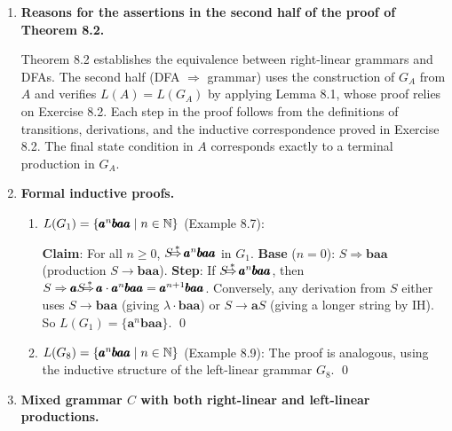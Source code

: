 \begin{enumerate}[{8.}1. ]
\begin{enumerate}
\item Inductive statement: For all $n \geq 0$ and $x \in \Sigma^n$ and nonterminal $A$: $A \DRightarrow x$ in the left-linear grammar $G$ iff the reversed string $x^r$ leads from the start state to $A$ in the reversed automaton.

\item Proof by induction on $|x|$, symmetric to Exercise 8.23. \qed
\end{enumerate}

\item \textbf{Reasons for the assertions in the second half of the proof of Theorem 8.2.}

Theorem 8.2 establishes the equivalence between right-linear grammars and DFAs. The second half (DFA $\Rightarrow$ grammar) uses the construction of $G_A$ from $A$ and verifies $L(A) = L(G_A)$ by applying Lemma 8.1, whose proof relies on Exercise 8.2. Each step in the proof follows from the definitions of transitions, derivations, and the inductive correspondence proved in Exercise 8.2. The final state condition in $A$ corresponds exactly to a terminal production in $G_A$.

\item \textbf{Formal inductive proofs.}

\begin{enumerate}
\item $L(G_1) = \{\pmb{a}^n\pmb{baa} \mid n \in \mathbb{N}\}$ (Example 8.7):

\textbf{Claim}: For all $n \geq 0$, $S \DRightarrow \pmb{a}^n\pmb{baa}$ in $G_1$.
\textbf{Base} ($n=0$): $S \Rightarrow \pmb{baa}$ (production $S \to \pmb{baa}$).
\textbf{Step}: If $S \DRightarrow \pmb{a}^n\pmb{baa}$, then $S \Rightarrow \pmb{a}S \DRightarrow \pmb{a}\cdot\pmb{a}^n\pmb{baa} = \pmb{a}^{n+1}\pmb{baa}$.
Conversely, any derivation from $S$ either uses $S \to \pmb{baa}$ (giving $\lambda\cdot\pmb{baa}$) or $S \to \pmb{a}S$ (giving a longer string by IH). So $L(G_1) = \{\pmb{a}^n\pmb{baa}\}$. \qed

\item $L(G_8) = \{\pmb{a}^n\pmb{baa} \mid n \in \mathbb{N}\}$ (Example 8.9): The proof is analogous, using the inductive structure of the left-linear grammar $G_8$. \qed
\end{enumerate}

\item \textbf{Mixed grammar $C$ with both right-linear and left-linear productions.}


\end{enumerate}
